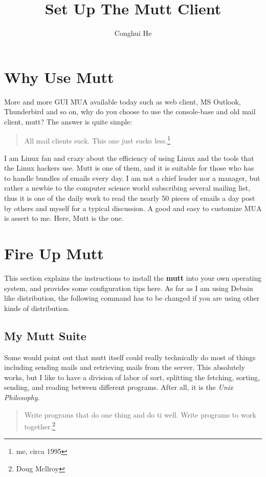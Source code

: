 \documentclass{article}
\title{Set Up The Mutt Client}
\author{Conghui He}
\begin{document}
\maketitle

\section{Why Use Mutt}
More and more GUI MUA available today such as web client, MS Outlook, 
Thunderbird and so on, why do you choose to use the console-base and old 
mail client, mutt? The answer is quite simple:
\begin{quote}
  All mail clients suck. This one just sucks less.\footnote{me, circa 1995}
\end{quote}


I am Linux fan and crazy about the efficiency of using Linux and the tools 
that the Linux hackers use. Mutt is one of them, and it is suitable for 
those who has to handle bundles of emails every day. I am not a chief leader 
nor a manager, but rather a newbie to the computer science world subscribing 
several mailing list, thus it is one of the daily work to read the 
nearly 50 pieces of emails a day post by others and myself for a typical 
discussion. A good and easy to customize MUA is assert to me. Here, Mutt is 
the one.

\section{Fire Up Mutt}
This section explains the instructions to install the \textbf{mutt} into 
your own operating system, and provides some configuration tips here. As far 
as I am using Debain like distribution, the following command has to be 
changed if you are using other kinds of distribution.

\subsection{My Mutt Suite}
Some would point out that mutt itself could really technically do most of 
things including sending mails and retrieving mails from the server. This 
absolutely works, but I like to have a division of labor of sort, splitting 
the fetching, sorting, sending, and reading between different programs. 
After all, it is the \emph{Unix Philosophy}.
\begin{quote}
  Write programs that do one thing and do ti well. Write programs to work 
  together.\footnote{Doug Mcllroy}
\end{quote}
\end{document}
